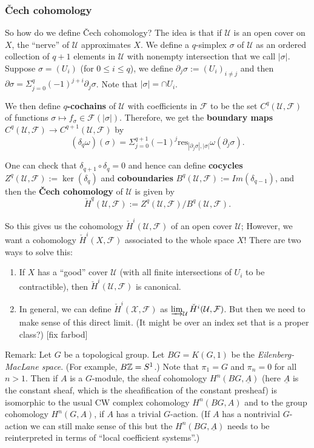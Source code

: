 \begin{example}
\subsubsection{\v{C}ech cohomology}
So how do we define \v{C}ech cohomology? The idea is that if $\mathcal{U}$ is an open cover on $X$, the ``nerve'' of $\mathcal{U}$ approximates $X$. We define a $q$-simplex $\sigma$ of $\mathcal{U}$ as an ordered collection of $q+1$ elements in $\mathcal{U}$ with nonempty intersection that we call $|\sigma|$. Suppose $\sigma=(U_i)$ (for $0\leq i \leq q$), we define $\partial_j \sigma:=(U_i)_{i\not= j}$ and then $\partial\sigma=\Sigma_{j=0}^q (-1)^{j+i}\partial_j\sigma$. Note that $|\sigma|=\cap U_i$. 

We then define \textbf{$q$-cochains} of $\mathcal{U}$ with coefficients in $\mathcal{F}$ to be the set $C^q(\mathcal{U},\mathcal{F})$ of functions $\sigma\mapsto f_\sigma \in \mathcal{F}(|\sigma|)$. Therefore, we get the \textbf{boundary maps} $C^q(\mathcal{U},\mathcal{F})\to C^{q+1}(\mathcal{U},\mathcal{F})$ by 
$$(\delta_q \omega)(\sigma)=\Sigma_{j=0}^{q+1} (-1)^j \text{res}_{|\partial_j \sigma|,|\sigma|} \omega(\partial_j\sigma).$$

One can check that $\delta_{q+1}\circ \delta_q=0$ and hence can define \textbf{cocycles} $Z^q(\mathcal{U},\mathcal{F}):=\ker(\delta_q)$ and \textbf{coboundaries} $B^q(\mathcal{U},\mathcal{F}):=Im(\delta_{q-1})$, and then the \textbf{\v{C}ech cohomology} of $\mathcal{U}$ is given by 
$$\check{H}^q(\mathcal{U},\mathcal{F}):=Z^q(\mathcal{U},\mathcal{F})/B^q(\mathcal{U},\mathcal{F}).$$

So this gives us the cohomology $\check{H}^i(\mathcal{U},\mathcal{F})$ of an open cover $\mathcal{U}$; However, we want a cohomology $\check{H}^i(X,\mathcal{F})$ associated to the whole space $X$! There are two ways to solve this:

\begin{enumerate}
\item If $X$ has a ``good'' cover $\mathcal{U}$ (with all finite intersections of $U_i$ to be contractible), then $\check{H}^i(\mathcal{U},\mathcal{F})$ is canonical.

\item In general, we can define $\check{H}^i(\mathcal{X},\mathcal{F})$ as $\varinjlim_{\mathcal{U}} \check{H}^i(\mathcal{U},\mathcal{F})$. But then we need to make sense of this direct limit. (It might be over an index set that is a proper class?) [fix farbod]
\end{enumerate}

Remark: Let $G$ be a topological group. Let $BG=K(G,1)$ be the \emph{Eilenberg-MacLane space}. (For example, $B{\mathbb Z}=S^1$.) Note that $\pi_1=G$ and $\pi_n=0$ for all $n>1$. Then if $A$ is a $G$-module, the sheaf cohomology $H^n(BG,\underline{A})$ (here $\underline{A}$ is the constant sheaf, which is the sheafification of the constant presheaf) is isomorphic to the usual CW complex cohomology $H^n(BG,A)$ and to the group cohomology $H^n(G,A)$, if $A$ has a trivial $G$-action. (If $A$ has a nontrivial $G$-action we can still make sense of this but the $H^n(BG,\underline{A})$ needs to be reinterpreted in terms of ``local coefficient systems''.)
\end{example}

